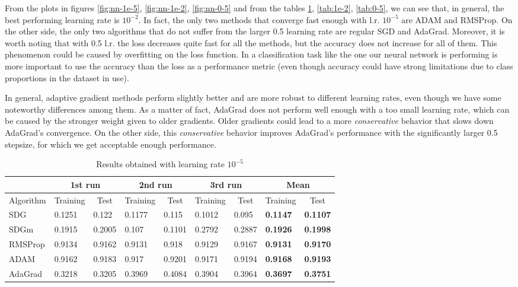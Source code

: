 \documentclass[12pt]{article}
\begin{document}
From the plots in figures \ref{fig:nn-1e-5}, \ref{fig:nn-1e-2}, \ref{fig:nn-0-5} and from the tables \ref{tab:1e-5}, \ref{tab:1e-2}, \ref{tab:0-5}, we can see that, in general, the best performing learning rate is $10^{-2}$. In fact, the only two methods that converge fast enough with l.r. $10^{-5}$ are ADAM and RMSProp. On the other side, the only two algorithms that do not suffer from the larger 0.5 learning rate are regular SGD and AdaGrad. Moreover, it is worth noting that with 0.5 l.r. the loss decreases quite fast for all the methods, but the accuracy does not increase for all of them. This phenomenon could be caused by overfitting on the loss function. In a classification task like the one our neural network is performing is more important to use the accuracy than the loss as a performance metric (even though accuracy could have strong limitations due to class proportions in the dataset in use).

In general, adaptive gradient methods perform slightly better and are more robust to different learning rates, even though we have some noteworthy differences among them. As a matter of fact, AdaGrad does not perform well enough with a too small learning rate, which can be caused by the stronger weight given to older gradients. Older gradients could lead to a more \textit{conservative} behavior that slows down AdaGrad's convergence. On the other side, this \textit{conservative} behavior improves AdaGrad's performance with the significantly larger 0.5 stepsize, for which we get acceptable enough performance.

\begin{table}
\centering
\begin{tabular}{l|l|l|l|l|l|l|l|l|}
\cline{2-9}
 & \multicolumn{2}{c|}{1st run} & \multicolumn{2}{c|}{2nd run} & \multicolumn{2}{c|}{3rd run} & \multicolumn{2}{c|}{Mean} \\ \hline
\multicolumn{1}{|l|}{Algorithm} & \multicolumn{1}{c|}{Training} & \multicolumn{1}{c|}{Test} & \multicolumn{1}{c|}{Training} & \multicolumn{1}{c|}{Test} & \multicolumn{1}{c|}{Training} & \multicolumn{1}{c|}{Test} & \multicolumn{1}{c|}{Training} & \multicolumn{1}{c|}{Test} \\ \hline
\multicolumn{1}{|l|}{SDG} & 0.1251 & 0.122 & 0.1177 & 0.115 & 0.1012 & 0.095 & \textbf{0.1147} & \textbf{0.1107} \\ \cline{1-1}
\multicolumn{1}{|l|}{SDGm} & 0.1915 & 0.2005 & 0.107 & 0.1101 & 0.2792 & 0.2887 & \textbf{0.1926} & \textbf{0.1998} \\ \cline{1-1}
\multicolumn{1}{|l|}{RMSProp} & 0.9134 & 0.9162 & 0.9131 & 0.918 & 0.9129 & 0.9167 & \textbf{0.9131} & \textbf{0.9170} \\ \cline{1-1}
\multicolumn{1}{|l|}{ADAM} & 0.9162 & 0.9183 & 0.917 & 0.9201 & 0.9171 & 0.9194 & \textbf{0.9168} & \textbf{0.9193} \\ \cline{1-1}
\multicolumn{1}{|l|}{AdaGrad} & 0.3218 & 0.3205 & 0.3969 & 0.4084 & 0.3904 & 0.3964 & \textbf{0.3697} & \textbf{0.3751} \\ \hline
\end{tabular}
\caption{Results obtained with learning rate $10^{-5}$}
\label{tab:1e-5}
\end{table}
\end{document}
